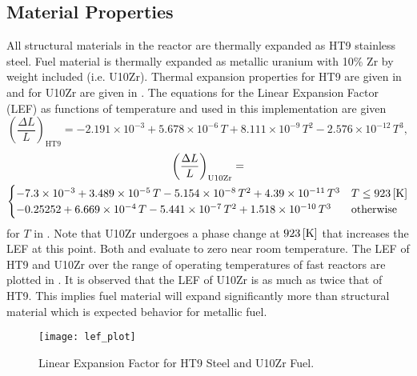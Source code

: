   \subsection{Material Properties}
    \label{sec:model_details__material_properties}
    All structural materials in the reactor are thermally expanded as HT9 
    stainless steel.
    Fuel material is thermally expanded as metallic uranium with 10\% Zr by 
    weight included (i.e. U10Zr). Thermal expansion properties for HT9 are given 
    in \cite{ht9Prop} and for U10Zr are given in \cite{thexpU10Zr}. The 
    equations for the Linear Expansion Factor (LEF) as functions of temperature 
    and used in this implementation are given
    \begin{equation}
      \label{eq:lef_ht9}
      \left( \frac{\Delta L}{L} \right)_{\text{HT9}} = 
        -2.191 \times 10^{-3} + 5.678 \times 10^{-6} \, T + 
        8.111 \times 10^{-9} \, T^2 - 2.576 \times 10^{-12} \, T^3 ,
    \end{equation}
    \begin{multline}
      \label{eq:lef_u10zr}
      \left( \frac{\Delta L}{L} \right)_{\text{U10Zr}} = \\
        \begin{cases}
          -7.3 \times 10^{-3} + 3.489 \times 10^{-5} \, T 
            - 5.154 \times 10^{-8} \, T^2 + 4.39 \times 10^{-11} \, T^3 & 
            T \le 923 \left[\text{{K}}\right] \\
          -0.25252 + 6.669 \times 10^{-4} \, T - 5.441 \times 10^{-7} \, T^2 
            + 1.518 \times 10^{-10} \, T^3 & \text{otherwise}
        \end{cases}
    \end{multline}
    for $T$ in . Note that U10Zr undergoes a phase change at 
    $923 \left[\text{{K}}\right]$ that increases the LEF at this point. Both 
    and  evaluate to zero near room temperature. The LEF of 
    HT9 and U10Zr over the range of operating temperatures of fast reactors are 
    plotted in . It is observed that the LEF of U10Zr is as 
    much as twice that of HT9. This implies fuel material will expand 
    significantly more than structural material which is expected behavior for 
    metallic fuel.

    \begin{figure}
      \centering
      \texttt{[image: lef\_plot]}
      \caption{Linear Expansion Factor for HT9 Steel and U10Zr Fuel.}
      \label{fig:lef_plot}
    \end{figure}
    
